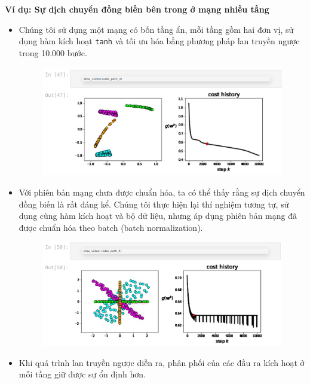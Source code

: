 \documentclass{book}
\begin{document}
    \textbf{Ví dụ: Sự dịch chuyển đồng biến bên trong ở mạng nhiều tầng}
    \begin{itemize}
        \item Chúng tôi sử dụng một mạng có bốn tầng ẩn, mỗi tầng gồm hai đơn vị, sử dụng hàm kích hoạt \texttt{tanh} và tối ưu hóa bằng phương pháp lan truyền ngược trong 10.000 bước.
        \begin{figure}[H]
            \centering
            \includegraphics[width=1.0\linewidth]{images/multi1.png}
            \label{fig:multi1}
        \end{figure}
        \item Với phiên bản mạng chưa được chuẩn hóa, ta có thể thấy rằng sự dịch chuyển đồng biến là rất đáng kể.
        Chúng tôi thực hiện lại thí nghiệm tương tự, sử dụng cùng hàm kích hoạt và bộ dữ liệu, nhưng áp dụng phiên bản mạng đã được chuẩn hóa theo batch (batch normalization).
        \begin{figure}[H]
            \centering
            \includegraphics[width=1.0\linewidth]{images/multi2.png}
            \label{fig:multi2}
        \end{figure}
        \item Khi quá trình lan truyền ngược diễn ra, phân phối của các đầu ra kích hoạt ở mỗi tầng giữ được sự ổn định hơn.
    \end{itemize}
\end{document}
